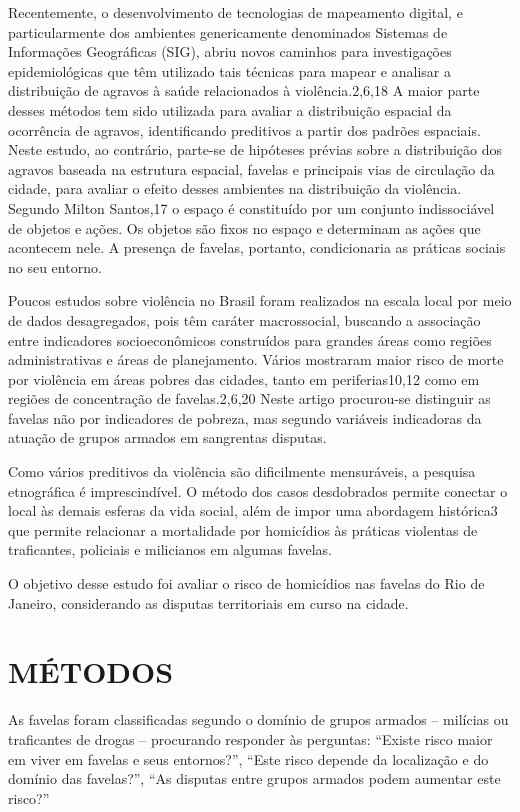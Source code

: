 \documentclass{article}
\begin{document}
Recentemente, o desenvolvimento de tecnologias de mapeamento digital, e
particularmente dos ambientes genericamente denominados Sistemas de Informações
Geográficas (SIG), abriu novos caminhos para investigações epidemiológicas que
têm utilizado tais técnicas para mapear e analisar a distribuição de agravos à
saúde relacionados à violência.2,6,18 A maior parte desses métodos tem sido
utilizada para avaliar a distribuição espacial da ocorrência de agravos,
identificando preditivos a partir dos padrões espaciais. Neste estudo, ao
contrário, parte-se de hipóteses prévias sobre a distribuição dos agravos
baseada na estrutura espacial, favelas e principais vias de circulação da
cidade, para avaliar o efeito desses ambientes na distribuição da violência.
Segundo Milton Santos,17 o espaço é constituído por um conjunto indissociável de
objetos e ações. Os objetos são fixos no espaço e determinam as ações que
acontecem nele. A presença de favelas, portanto, condicionaria as práticas
sociais no seu entorno.

Poucos estudos sobre violência no Brasil foram realizados na escala local por
meio de dados desagregados, pois têm caráter macrossocial, buscando a associação
entre indicadores socioeconômicos construídos para grandes áreas como regiões
administrativas e áreas de planejamento. Vários mostraram maior risco de morte
por violência em áreas pobres das cidades, tanto em periferias10,12 como em
regiões de concentração de favelas.2,6,20 Neste artigo procurou-se distinguir as
favelas não por indicadores de pobreza, mas segundo variáveis indicadoras da
atuação de grupos armados em sangrentas disputas.

Como vários preditivos da violência são dificilmente mensuráveis, a pesquisa
etnográfica é imprescindível. O método dos casos desdobrados permite conectar o
local às demais esferas da vida social, além de impor uma abordagem histórica3
que permite relacionar a mortalidade por homicídios às práticas violentas de
traficantes, policiais e milicianos em algumas favelas.

O objetivo desse estudo foi avaliar o risco de homicídios nas favelas do Rio de
Janeiro, considerando as disputas territoriais em curso na cidade.

\section{MÉTODOS}

As favelas foram classificadas segundo o domínio de grupos armados – milícias ou
traficantes de drogas – procurando responder às perguntas: “Existe risco maior
em viver em favelas e seus entornos?”, “Este risco depende da localização e do
domínio das favelas?”, “As disputas entre grupos armados podem aumentar este
risco?”
\end{document}
